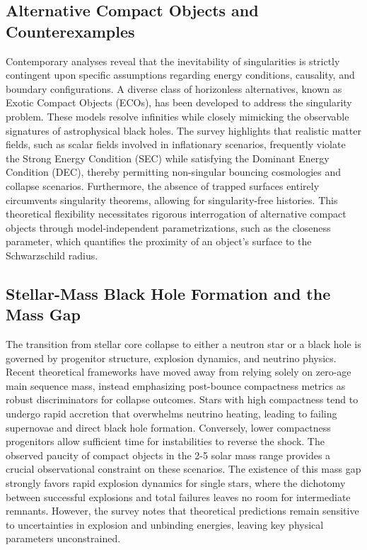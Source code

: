 \documentclass[conference]{IEEEtran}
\begin{document}
\subsection{Alternative Compact Objects and Counterexamples}
Contemporary analyses reveal that the inevitability of singularities is strictly contingent upon specific assumptions regarding energy conditions, causality, and boundary configurations. A diverse class of horizonless alternatives, known as Exotic Compact Objects (ECOs), has been developed to address the singularity problem. These models resolve infinities while closely mimicking the observable signatures of astrophysical black holes. The survey highlights that realistic matter fields, such as scalar fields involved in inflationary scenarios, frequently violate the Strong Energy Condition (SEC) while satisfying the Dominant Energy Condition (DEC), thereby permitting non-singular bouncing cosmologies and collapse scenarios. Furthermore, the absence of trapped surfaces entirely circumvents singularity theorems, allowing for singularity-free histories. This theoretical flexibility necessitates rigorous interrogation of alternative compact objects through model-independent parametrizations, such as the closeness parameter, which quantifies the proximity of an object's surface to the Schwarzschild radius.

\subsection{Stellar-Mass Black Hole Formation and the Mass Gap}
The transition from stellar core collapse to either a neutron star or a black hole is governed by progenitor structure, explosion dynamics, and neutrino physics. Recent theoretical frameworks have moved away from relying solely on zero-age main sequence mass, instead emphasizing post-bounce compactness metrics as robust discriminators for collapse outcomes. Stars with high compactness tend to undergo rapid accretion that overwhelms neutrino heating, leading to failing supernovae and direct black hole formation. Conversely, lower compactness progenitors allow sufficient time for instabilities to reverse the shock. The observed paucity of compact objects in the 2-5 solar mass range provides a crucial observational constraint on these scenarios. The existence of this mass gap strongly favors rapid explosion dynamics for single stars, where the dichotomy between successful explosions and total failures leaves no room for intermediate remnants. However, the survey notes that theoretical predictions remain sensitive to uncertainties in explosion and unbinding energies, leaving key physical parameters unconstrained.
\end{document}
